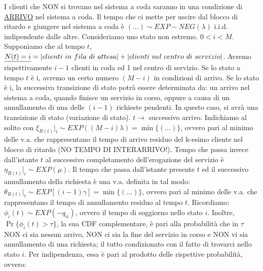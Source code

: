\begin{center}
\end{center}

I clienti che NON si trovano nel sistema a coda saranno in una condizione di \underline{ARRIVO} nel sistema a coda. Il tempo che ci mette per uscire dal blocco di ritardo e giungere nel sistema a coda è $(\dots)\sim EXP-NEG(\lambda)$ i.i.d. indipendente dalle altre. Consideriamo uno stato non estremo. $0<i<M$. Supponiamo che al tempo $t$, $\underline{N(t)=i}=\cardinality{clienti\ in\ fila\ di\ attesa}+\cardinality{clienti\ nel\ centro\ di\ servizio}$. Avremo rispettivamente $i-1$ clienti in coda ed 1 nel centro di servizio. Se lo stato a tempo $t$ è i, avremo un certo numero $(M-i)$ in condizioni di arrivo. Se lo stato è i, la successiva transizione di stato potrà essere determinata da: un arrivo nel sistema a coda, quando finisce un servizio in corso, oppure a causa di un annullamento di una delle $(i-1)$ richieste pendenti. In questo caso, si avrà una transizione di stato (variazione di stato). $t \rightarrow$ successivo arrivo. Indichiamo al solito con $\xi_{R(t)}|_i\sim EXP ((M-i)\lambda) = \min\{(\dots)\}$, ovvero pari al minimo delle v.a. che rappresentano il tempo di arrivo residuo del k-esimo cliente nel blocco di ritardo (NO TEMPO DI INTERARRIVO!). Tempo che passa invece dall'istante $t$ al successivo completamento dell'erogazione del servizio è $\eta_{R(t)}|_i\sim EXP(\mu)$. Il tempo che passa dall'istante presente $t$ ed il successivo annullamento della richiesta è una v.a. definita in tal modo: $\theta_{R(t)}|_i\sim EXP[(i-1)\gamma]=\min\{(\dots)\}$, ovvero pari al minimo delle v.a. che rappresentano il tempo di annullamento residuo al tempo $t$. Ricordiamo: $\phi_i(t)\sim EXP(-q_{ii})$, ovvero il tempo di soggiorno nello stato $i$. Inoltre, $\Pr\{\phi_i(t)>\tau\}$, la sua CDF complementare, è pari alla probabilità che in $\tau$ NON ci sia nessun arrivo, NON ci sia la fine del servizio in corso e NON vi sia annullamento di una richiesta; il tutto condizionato con il fatto di trovarci nello stato $i$. Per indipendenza, essa è pari al prodotto delle rispettive probabilità, ovvero:

